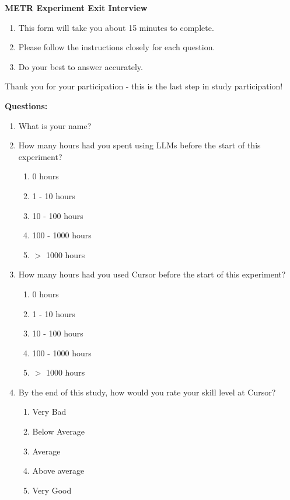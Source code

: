 \documentclass{article}
\begin{document}
\begin{instructionbox}

\textbf{METR Experiment Exit Interview}

\begin{enumerate}
    \item This form will take you about 15 minutes to complete.
    \item Please follow the instructions closely for each question.
    \item Do your best to answer accurately.
\end{enumerate}
Thank you for your participation - this is the last step in study participation!

\textbf{Questions:}

\begin{enumerate}
    \item What is your name?
    \item How many hours had you spent using LLMs before the start of this experiment?
    \begin{enumerate}
        \item 0 hours
        \item 1 - 10 hours
        \item 10 - 100 hours
        \item 100 - 1000 hours
        \item $>$ 1000 hours
    \end{enumerate}
    \item How many hours had you used Cursor before the start of this experiment?
    \begin{enumerate}
        \item 0 hours
        \item 1 - 10 hours
        \item 10 - 100 hours
        \item 100 - 1000 hours
        \item $>$ 1000 hours
    \end{enumerate}
    \item By the end of this study, how would you rate your skill level at Cursor?
    \begin{enumerate}
        \item Very Bad
        \item Below Average
        \item Average
        \item Above average
        \item Very Good
    \end{enumerate}

\end{enumerate}
\end{instructionbox}
\end{document}
